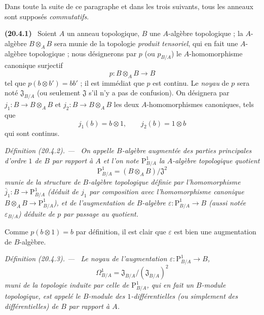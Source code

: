 \documentclass[10pt,oneside]{book}
\makeatletter
\newcommand{\setmanualcurrentlabel}[1]{\def\@currentlabel{#1}}
\newcommand{\oldpage}[2][]{%
  \setcounter{footnote}{0}%
  \marginpar{\scriptsize\textbf{#1}~|~#2}\ignorespaces}
\newenvironment{env}[1][]{\setmanualcurrentlabel{#1}\par\medskip\noindent\textbf{(#1)}\ }{\par}
\newenvironment{definition}[1][]{%
  \setmanualcurrentlabel{#1}\par\medskip\noindent\itshape Définition (#1). ---\ }{\par}
\makeatother
\begin{document}
Dans toute la suite de ce paragraphe et dans les trois suivants, tous les
anneaux sont supposés \emph{commutatifs}.

\begin{env}[20.4.1]
\label{0.20.4.1-fr}
Soient $A$ un anneau topologique, $B$ une $A$-algèbre topologique ; la
$A$-algèbre $B\otimes_A B$ sera munie de la topologie \emph{produit
tensoriel}, qui en fait une $A$-algèbre topologique ; nous désignerons par $p$
(ou $p_{B/A}$) le $A$-homomorphisme canonique surjectif
\begin{equation}
\tag{20.4.1.1}
\label{0.20.4.1.1-fr}
  p:B\otimes_A B\to B
\end{equation}
tel que $p(b\otimes b')=bb'$ ; il est immédiat que $p$ est continu. Le
\emph{noyau} de $p$ sera noté $\mathfrak{J}_{B/A}$ (ou seulement
$\mathfrak{J}$ s'il n'y a pas de confusion). On désignera par
$j_1:B\to B\otimes_A B$ et $j_2:B\to B\otimes_A B$ les deux
$A$-homomorphismes canoniques, tels que
\[
  j_1(b)=b\otimes1, \qquad j_2(b)=1\otimes b
\]
qui sont continus.
\end{env}

\oldpage[0\textsubscript{IV-1}]{124}
\begin{definition}[20.4.2]
\label{0.20.4.2-fr}
On appelle \emph{$B$-algèbre augmentée des parties principales d'ordre $1$ de
$B$ par rapport à $A$} et l'on note $\mathrm{P}^1_{B/A}$ la $A$-algèbre
topologique quotient
\begin{equation}
\tag{20.4.2.1}
\label{0.20.4.2.1-fr}
  \mathrm{P}^1_{B/A}=(B\otimes_A B)/\mathfrak{J}^2
\end{equation}
munie de la structure de $B$-algèbre topologique définie par l'homomorphisme
$\bar{j}_1:B\to\mathrm{P}^1_{B/A}$ (déduit de $j_1$ par composition avec
l'homomorphisme canonique $B\otimes_A B\to\mathrm{P}^1_{B/A}$), et de
l'augmentation de $B$-algèbre $\varepsilon:\mathrm{P}^1_{B/A}\to B$ (aussi
notée $\varepsilon_{B/A}$) déduite de $p$ par passage au quotient.

Comme $p(b\otimes1)=b$ par définition, il est clair que $\varepsilon$ est
bien une augmentation de $B$-algèbre.
\end{definition}

\begin{definition}[20.4.3]
\label{0.20.4.3-fr}
Le noyau de l'augmentation $\varepsilon:\mathrm{P}^1_{B/A}\to B$,
\begin{equation}
\tag{20.4.3.1}
\label{0.20.4.3.1-fr}
  \Omega^1_{B/A}=\mathfrak{J}_{B/A}/(\mathfrak{J}_{B/A})^2
\end{equation}
muni de la topologie induite par celle de $\mathrm{P}^1_{B/A}$, qui en fait
un $B$-module topologique, est appelé le $B$-module des
\emph{$1$-différentielles} (ou simplement des \emph{différentielles}) de $B$
par rapport à $A$.
\end{definition}
\end{document}
